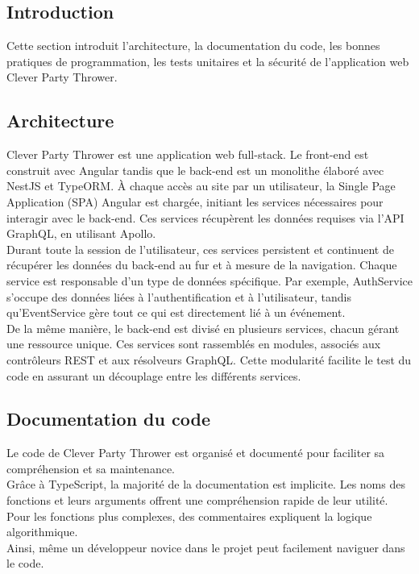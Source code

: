 \subsection{Introduction}\label{subsec:introduction}
Cette section introduit l'architecture, la documentation du code, les bonnes pratiques de programmation, les tests unitaires et la sécurité de l'application web Clever Party Thrower.

\subsection{Architecture}\label{subsec:architecture}
Clever Party Thrower est une application web full-stack.
Le front-end est construit avec Angular tandis que le back-end est un monolithe élaboré avec NestJS et TypeORM. À chaque accès au site par un utilisateur,
la Single Page Application (SPA) Angular est chargée, initiant les services nécessaires pour interagir avec le back-end.
Ces services récupèrent les données requises via l'API GraphQL, en utilisant Apollo.\\

Durant toute la session de l'utilisateur, ces services persistent et continuent de récupérer les données du back-end au fur et à mesure de la navigation.
Chaque service est responsable d'un type de données spécifique.
Par exemple, AuthService s'occupe des données liées à l'authentification et à l'utilisateur, tandis qu'EventService gère tout ce qui est directement lié à un événement.\\

De la même manière, le back-end est divisé en plusieurs services, chacun gérant une ressource unique.
Ces services sont rassemblés en modules, associés aux contrôleurs REST et aux résolveurs GraphQL. Cette modularité facilite le test du code en assurant un découplage
entre les différents services.\\

\subsection{Documentation du code}\label{subsec:documentation-du-code}
Le code de Clever Party Thrower est organisé et documenté pour faciliter sa compréhension et sa maintenance.\\
Grâce à TypeScript, la majorité de la documentation est implicite.
Les noms des fonctions et leurs arguments offrent une compréhension rapide de leur utilité.
Pour les fonctions plus complexes, des commentaires expliquent la logique algorithmique.\\
Ainsi, même un développeur novice dans le projet peut facilement naviguer dans le code.

